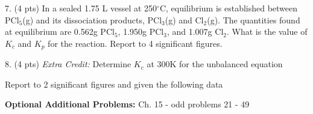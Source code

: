 \documentclass[11pt]{article}
\begin{document}
\pagebreak

7. (4 pts) In a sealed 1.75 L vessel at 250$^\circ$C, equilibrium is established between
PCl$_5$(g) and its dissociation products, PCl$_3$(g) and Cl$_2$(g). The quantities found
at equilibrium are 0.562g PCl$_5$, 1.950g PCl$_3$, and 1.007g Cl$_2$. What is the value of
$K_c$ and $K_p$ for the reaction. Report to 4 significant figures.
\begin{center}
\end{center}

%
%

\vspace{3in}

8. (4 pts) \textit{Extra Credit:} Determine $K_c$ at 300K for the unbalanced equation
\begin{center}
\end{center}
Report to 2 significant figures and given the following data
\begin{center}


\end{center}


\vfill
\textbf{Optional Additional Problems:} Ch. 15 - odd problems 21 - 49 
\end{document}
